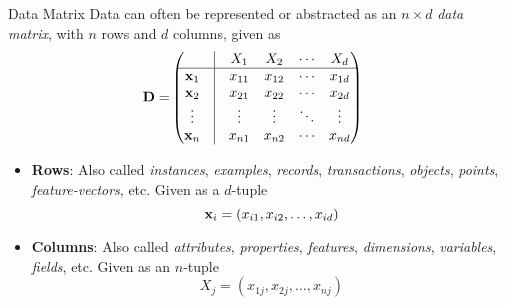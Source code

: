\date{Chapter 1: Data Mining and Analysis}

\begin{frame}
\titlepage
\end{frame}

\begin{frame}{Data Matrix}
Data can often be represented or abstracted as an $n
\times d$ {\em data matrix},
with $n$ rows and $d$ columns, given as
\begin{align*}
        \bD = &
        \matr{%
            & \vline & X_1 & X_2 & \cdots & X_d\\
            \hline
            \bx_1 & \vline & x_{11} & x_{12} & \cdots & x_{1d}\\
            \bx_2 & \vline& x_{21} & x_{22} & \cdots & x_{2d}\\
            \vdots & \vline& \vdots & \vdots & \ddots & \vdots\\
            \bx_n & \vline& x_{n1} & x_{n2} & \cdots & x_{nd}
        }
\end{align*}
\begin{itemize}
  \item {\bf Rows}: Also called 
{\em instances}, {\em examples}, {\em records}, {\em
transactions}, {\em objects}, {\em points}, {\em feature-vectors}, etc.
Given as a $d$-tuple 
$$\mathbf{x}_i = (x_{i1}, x_{i2}, \ldots, x_{id})$$
\item {\bf Columns}: Also called 
{\em attributes}, {\em properties}, {\em features}, {\em dimensions}, {\em
variables}, {\em f\/{i}elds}, etc. Given as an $n$-tuple
$$X_{j} = (x_{1j}, x_{2j}, \ldots, x_{nj})$$
\end{itemize}
\end{frame}

